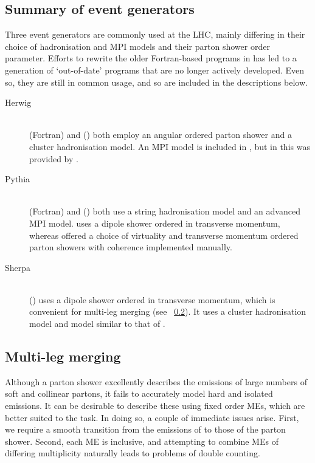 \subsection{Summary of event generators}
\label{sec:mc:generators}

Three event generators are commonly used at the \acs{LHC}, mainly differing in their 
choice of hadronisation and \ac{MPI} models and their parton shower order parameter. 
Efforts to rewrite the older Fortran-based programs in \cpp has led to a generation of 
`out-of-date' programs that are no longer actively developed. Even so, they are still in 
common usage, and so are included in the descriptions below.

\begin{description}
\item[Herwig] \hfill \\
	\fherwig (Fortran) \cite{fHerwig} and \herwigpp (\cpp) \cite{Herwig++} both employ an 
	angular ordered parton shower and a cluster hadronisation model. An \ac{MPI} model is 
	included in \herwigpp, but in \fherwig this was provided by \jimmy \cite{Jimmy}.
\item[Pythia] \hfill \\
	 (Fortran) \cite{Pythia6} and  (\cpp) \cite{Pythia8} both use a 
	string hadronisation model and an advanced \ac{MPI} model.  uses a dipole 
	shower ordered in transverse momentum, whereas  offered a choice of 
	virtuality and transverse momentum ordered parton showers with coherence implemented 
	manually.
\item[Sherpa] \hfill \\
	\sherpa (\cpp) \cite{Sherpa} uses a dipole shower ordered in transverse momentum, 
	which is convenient for multi-leg merging (see \Section~\ref{sec:mc:merging}). It 
	uses a cluster hadronisation model and  model similar to that of .
\end{description}



\subsection{Multi-leg merging}
\label{sec:mc:merging}

Although a parton shower excellently describes the emissions of large numbers of soft and 
collinear partons, it fails to accurately model hard and isolated emissions. It can be 
desirable to describe these using fixed order \acp{ME}, which are better suited to the 
task. In doing so, a couple of immediate issues arise. First, we require a smooth 
transition from the emissions of  to those of the parton shower. Second, each 
\ac{ME} is inclusive, and attempting to combine \acp{ME} of differing multiplicity 
naturally leads to problems of double counting.


